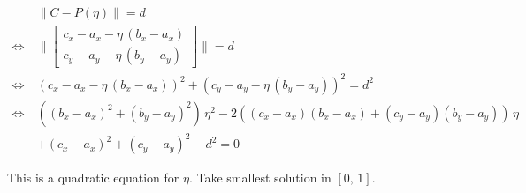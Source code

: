 \begin{align*}
&\lVert C - P(\eta)\rVert = d\\
\Leftrightarrow\:&\lVert
\begin{bmatrix}
c_x - a_x - \eta\,(b_x - a_x) \\ c_y - a_y - \eta\,(b_y - a_y)
\end{bmatrix}
\rVert = d\\
\Leftrightarrow\:&\left(c_x - a_x - \eta\,(b_x - a_x)\right)^2 + \left(c_y - a_y - \eta\,(b_y - a_y)\right)^2 = d^2\\
\Leftrightarrow\:&\left((b_x - a_x)^2 + (b_y - a_y)^2\right)\,\eta^2-2\left((c_x - a_x)(b_x - a_x) + (c_y - a_y)(b_y - a_y)\right)\,\eta\\
&+(c_x - a_x)^2 + (c_y - a_y)^2 - d^2 = 0
\end{align*}

This is a quadratic equation for $\eta$. Take smallest solution in $[0,\,1]$.

